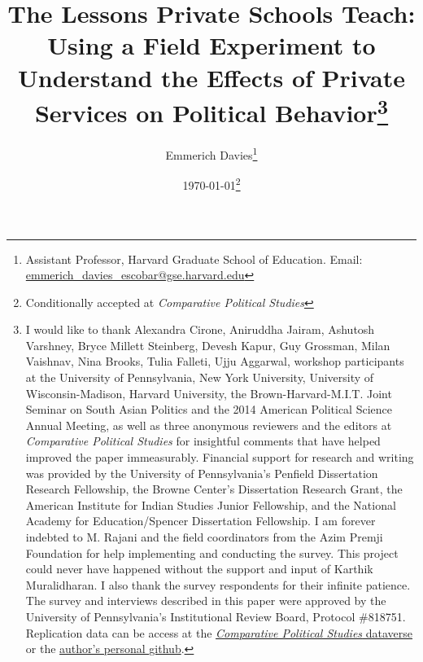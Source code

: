 \title{The Lessons Private Schools Teach: Using a Field Experiment to Understand the Effects of Private Services on Political Behavior\thanks{I would like to thank Alexandra Cirone, Aniruddha Jairam, Ashutosh Varshney, Bryce Millett Steinberg, Devesh Kapur, Guy Grossman, Milan Vaishnav, Nina Brooks, Tulia Falleti, Ujju Aggarwal, workshop participants at the University of Pennsylvania, New York University, University of Wisconsin-Madison, Harvard University, the Brown-Harvard-M.I.T. Joint Seminar on South Asian Politics and the 2014 American Political Science Annual Meeting, as well as three anonymous reviewers and the editors at \emph{Comparative Political Studies} for insightful comments that have helped improved the paper immeasurably.  Financial support for research and writing was provided by the University of Pennsylvania's Penfield Dissertation Research Fellowship, the Browne Center's Dissertation Research Grant, the American Institute for Indian Studies Junior Fellowship, and the National Academy for Education/Spencer Dissertation Fellowship.  I am forever indebted to M. Rajani and the field coordinators from the Azim Premji Foundation for help implementing and conducting the survey.  This project could never have happened without the support and input of Karthik Muralidharan.  I also thank the survey respondents for their infinite patience.  The survey and interviews described in this paper were approved by the University of Pennsylvania's Institutional Review Board, Protocol \#818751. Replication data can be access at the \href{https://doi.org/10.7910/DVN/TDUVCJ}{\emph{Comparative Political Studies} dataverse} or the \href{https://github.com/eeemda/cps-downstream}{author's personal github}.}}

\author{Emmerich Davies\footnote{Assistant Professor, Harvard Graduate School of Education. Email: \href{mailto:emmerich_davies_escobar@gse.harvard.edu}{emmerich\_davies\_escobar@gse.harvard.edu}}}

\date{\today\footnote{Conditionally accepted at \emph{Comparative Political Studies}}}